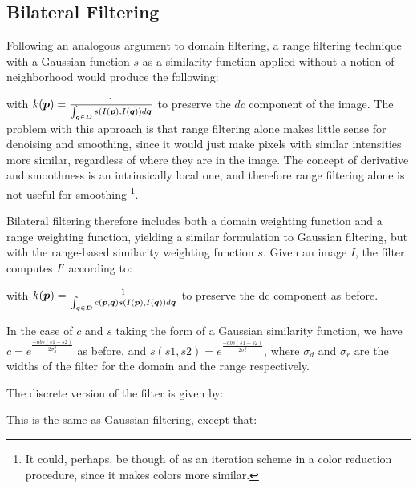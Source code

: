 \subsection{Bilateral Filtering}

Following an analogous argument to domain filtering, a range filtering technique with a Gaussian function $s$ as a similarity function applied without a notion of neighborhood would produce the following:


with $k(\boldsymbol{p})= \frac{1}{\int_{\boldsymbol{q} \in \boldsymbol{D} } s( I(\boldsymbol{p}),I(\boldsymbol{q})) d\boldsymbol{q}}$ to preserve the $dc$ component of the image. The problem with this approach is that range filtering alone makes little sense for denoising and smoothing, since it would just make pixels with similar intensities more similar, regardless of where they are in the image. The concept of derivative and smoothness is an intrinsically local one, and therefore range filtering alone is not useful for smoothing \footnote{It could, perhaps, be though of as an iteration scheme in a color reduction procedure, since it makes colors more similar.}.


Bilateral filtering therefore includes both a domain weighting function and a range weighting function, yielding a similar formulation to Gaussian filtering, but with the range-based similarity weighting function $s$. Given an image $I$, the filter computes $I'$ according to:


with $k(\boldsymbol{p})= \frac{1}{\int_{\boldsymbol{q} \in \boldsymbol{D} } c(\boldsymbol{p},\boldsymbol{q}) s( I(\boldsymbol{p}),I(\boldsymbol{q})) d\boldsymbol{q}}$ to preserve the dc component as before.

In the case of $c$ and $s$ taking the form of a Gaussian similarity function, we have $c=e^{ \frac{ -abs(s1-s2) }{2 \sigma_d^2 }}$ as before, and $s(s1,s2)=e^{ \frac{ -abs(s1-s2) }{2 \sigma_r^2 }}$, where $\sigma_d$ and $\sigma_r$ are the widths of the filter for the domain and the range respectively.

The discrete version of the filter is given by:


This is the same as Gaussian filtering, except that:

